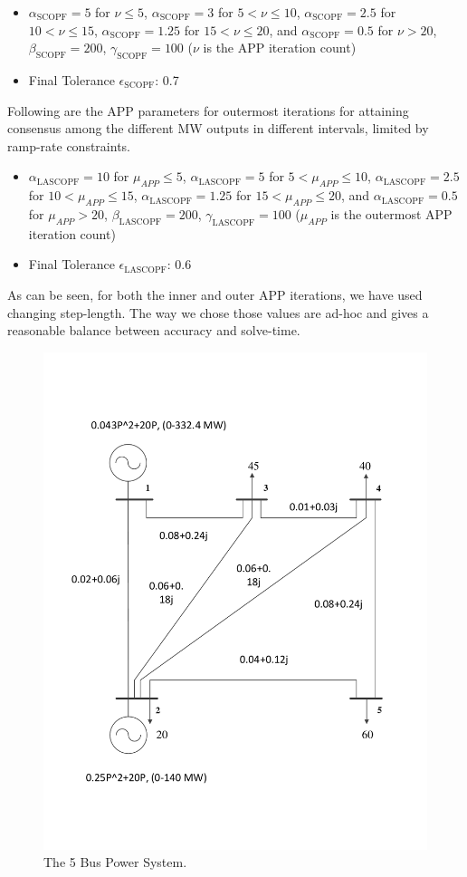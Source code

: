 \documentclass[preprint,12pt,3p]{elsarticle}
\begin{document}
\begin{itemize}
    \item $\alpha_{\text{SCOPF}}=5$ for $\nu\leq5$, $\alpha_{\text{SCOPF}}=3$ for $5<\nu\leq10$, $\alpha_{\text{SCOPF}}=2.5$ for $10<\nu\leq15$, $\alpha_{\text{SCOPF}}=1.25$ for $15<\nu\leq20$, and $\alpha_{\text{SCOPF}}=0.5$ for $\nu>20$, $\beta_{\text{SCOPF}}=200$, $\gamma_{\text{SCOPF}}=100$ ($\nu$ is the APP iteration count)
    \item Final Tolerance $\epsilon_{\text{SCOPF}}$: 0.7
\end{itemize}
Following are the APP parameters for outermost iterations for attaining consensus among the different MW outputs in different intervals, limited by ramp-rate constraints.
\begin{itemize}
    \item $\alpha_{\text{LASCOPF}}=10$ for $\mu_{APP}\leq5$, $\alpha_{\text{LASCOPF}}=5$ for $5<\mu_{APP}\leq10$, $\alpha_{\text{LASCOPF}}=2.5$ for $10<\mu_{APP}\leq15$, $\alpha_{\text{LASCOPF}}=1.25$ for $15<\mu_{APP}\leq20$, and $\alpha_{\text{LASCOPF}}=0.5$ for $\mu_{APP}>20$, $\beta_{\text{LASCOPF}}=200$, $\gamma_{\text{LASCOPF}}=100$ ($\mu_{APP}$ is the outermost APP iteration count)
    \item Final Tolerance $\epsilon_{\text{LASCOPF}}$: 0.6
\end{itemize}
As can be seen, for both the inner and outer APP iterations, we have used changing step-length. The way we chose those values are ad-hoc and gives a reasonable balance between accuracy and solve-time. 
\iffalse
\begin{figure}
\begin{center}
\includegraphics[width=0.92\linewidth,trim=5mm 12mm 5mm 5mm, clip]{5_bus}
\caption{The 5 Bus Power System.}
\label{fig:5Bus}
\end{center}
\end{figure}
\end{document}
